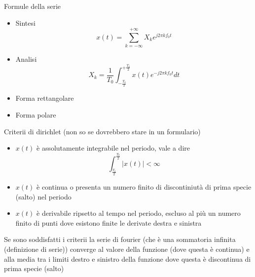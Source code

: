 \documentclass{article}
\begin{document}
Formule della serie
\begin{itemize}
\item Sintesi \begin{equation*}
  x(t) = \sum_{k=-\infty}^{+\infty} X_k e^{j2\pi kf_0 t}
\end{equation*}
\item Analisi \begin{equation*}
  X_k = \frac{1}{T_0}\int_{-\frac{T_0}{2}}^{+\frac{T_0}{2}} x(t) e^{-j2\pi kf_0 t} dt
\end{equation*}
\item Forma rettangolare
\item Forma polare
\end{itemize}

Criterii di dirichlet (non so se dovrebbero stare in un formulario)
\begin{itemize}
\item $x(t)$ è assolutamente integrabile nel periodo, vale a dire \begin{equation*}
  \int_{\frac{T_0}{2}}^{\frac{T_0}{2}} \lvert x(t) \rvert < \infty
\end{equation*}
\item $x(t)$ è continua o presenta un numero finito di discontiniutà di prima specie (salto) nel periodo
\item $x(t)$ è derivabile ripsetto al tempo nel periodo, escluso al più un numero finito di punti dove esistono finite le derivate destra e sinistra
\end{itemize}
Se sono soddisfatti i criterii la serie di fourier (che è una sommatoria infinita (definizione di serie)) converge al valore della funzione (dove questa è continua) e alla media tra i limiti destro e sinistro della funzione dove questa è discontinua di prima specie (salto)
\end{document}
